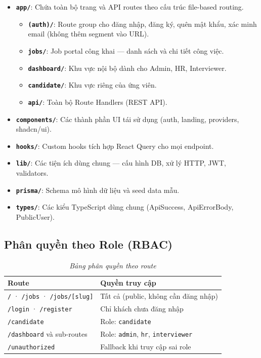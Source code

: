 \begin{itemize}
    \item \textbf{\texttt{app/}}: Chứa toàn bộ trang và API routes theo cấu trúc file-based routing.
    \begin{itemize}
        \item \textbf{\texttt{(auth)/}}: Route group cho đăng nhập, đăng ký, quên mật khẩu, xác minh email (không thêm segment vào URL).
        \item \textbf{\texttt{jobs/}}: Job portal công khai --- danh sách và chi tiết công việc.
        \item \textbf{\texttt{dashboard/}}: Khu vực nội bộ dành cho Admin, HR, Interviewer.
        \item \textbf{\texttt{candidate/}}: Khu vực riêng của ứng viên.
        \item \textbf{\texttt{api/}}: Toàn bộ Route Handlers (REST API).
    \end{itemize}
    \item \textbf{\texttt{components/}}: Các thành phần UI tái sử dụng (auth, landing, providers, shadcn/ui).
    \item \textbf{\texttt{hooks/}}: Custom hooks tích hợp React Query cho mọi endpoint.
    \item \textbf{\texttt{lib/}}: Các tiện ích dùng chung --- cấu hình DB, xử lý HTTP, JWT, validators.
    \item \textbf{\texttt{prisma/}}: Schema mô hình dữ liệu và seed data mẫu.
    \item \textbf{\texttt{types/}}: Các kiểu TypeScript dùng chung (ApiSuccess, ApiErrorBody, PublicUser).
\end{itemize}

\subsection{Phân quyền theo Role (RBAC)}

\begin{table}[H]
    \centering
    \renewcommand{\arraystretch}{1.4}
    \begin{tabular}{|l|p{9cm}|}
        \hline
        \textbf{Route} & \textbf{Quyền truy cập} \\ \hline
        \texttt{/} · \texttt{/jobs} · \texttt{/jobs/[slug]} & Tất cả (public, không cần đăng nhập) \\ \hline
        \texttt{/login} · \texttt{/register} & Chỉ khách chưa đăng nhập \\ \hline
        \texttt{/candidate} & Role: \texttt{candidate} \\ \hline
        \texttt{/dashboard} và sub-routes & Role: \texttt{admin}, \texttt{hr}, \texttt{interviewer} \\ \hline
        \texttt{/unauthorized} & Fallback khi truy cập sai role \\ \hline
    \end{tabular}
    \caption{\textit{Bảng phân quyền theo route}}
    \label{tab:rbac}
\end{table}

